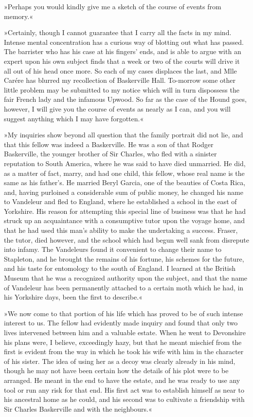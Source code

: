 »Perhaps you would kindly give me a sketch of the course of events from memory.«

»Certainly, though I cannot guarantee that I carry all the facts in my mind. Intense mental concentration has a curious way of blotting out what has passed. The barrister who has his case at his fingers' ends, and is able to argue with an expert upon his own subject finds that a week or two of the courts will drive it all out of his head once more. So each of my cases displaces the last, and Mlle Carére has blurred my recollection of Baskerville Hall. To-morrow some other little problem may be submitted to my notice which will in turn dispossess the fair French lady and the infamous Upwood. So far as the case of the Hound goes, however, I will give you the course of events as nearly as I can, and you will suggest anything which I may have forgotten.«

»My inquiries show beyond all question that the family portrait did not lie, and that this fellow was indeed a Baskerville. He was a son of that Rodger Baskerville, the younger brother of Sir Charles, who fled with a sinister reputation to South America, where he was said to have died unmarried. He did, as a matter of fact, marry, and had one child, this fellow, whose real name is the same as his father's. He married Beryl Garcia, one of the beauties of Costa Rica, and, having purloined a considerable sum of public money, he changed his name to Vandeleur and fled to England, where he established a school in the east of Yorkshire. His reason for attempting this special line of business was that he had struck up an acquaintance with a consumptive tutor upon the voyage home, and that he had used this man's ability to make the undertaking a success. Fraser, the tutor, died however, and the school which had begun well sank from disrepute into infamy. The Vandeleurs found it convenient to change their name to Stapleton, and he brought the remains of his fortune, his schemes for the future, and his taste for entomology to the south of England. I learned at the British Museum that he was a recognized authority upon the subject, and that the name of Vandeleur has been permanently attached to a certain moth which he had, in his Yorkshire days, been the first to describe.«

»We now come to that portion of his life which has proved to be of such intense interest to us. The fellow had evidently made inquiry and found that only two lives intervened between him and a valuable estate. When he went to Devonshire his plans were, I believe, exceedingly hazy, but that he meant mischief from the first is evident from the way in which he took his wife with him in the character of his sister. The idea of using her as a decoy was clearly already in his mind, though he may not have been certain how the details of his plot were to be arranged. He meant in the end to have the estate, and he was ready to use any tool or run any risk for that end. His first act was to establish himself as near to his ancestral home as he could, and his second was to cultivate a friendship with Sir Charles Baskerville and with the neighbours.«

